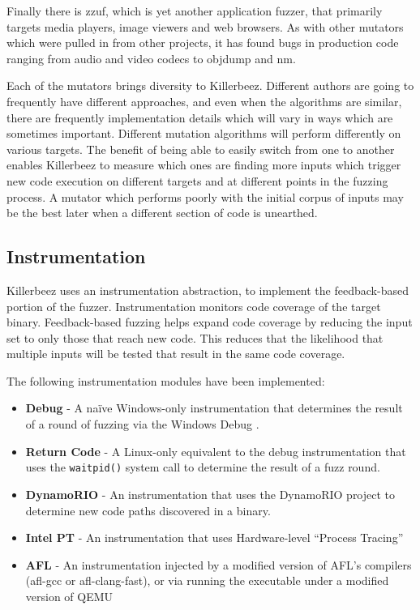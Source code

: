 Finally there is zzuf, which is yet another application fuzzer, that
primarily targets media players, image viewers and web browsers.  As with
other mutators which were pulled in from other projects, it has found bugs in
production code ranging from audio and video codecs to objdump and nm.

Each of the mutators brings diversity to Killerbeez.  Different authors are
going to frequently have different approaches, and even when the algorithms
are similar, there are frequently implementation details which will vary in
ways which are sometimes important.  Different mutation algorithms will
perform differently on various targets.  The benefit of being able to easily
switch from one to another enables Killerbeez to measure which ones are finding
more inputs which trigger new code execution on different targets and at different points in
the fuzzing process.  A mutator which performs poorly with the initial corpus
of inputs may be the best later when a different section of code is unearthed.

\subsection{Instrumentation} \label{Instrumentation}
Killerbeez uses an instrumentation abstraction, to implement the
feedback-based portion of the fuzzer. Instrumentation monitors code coverage of
the target binary. Feedback-based fuzzing helps expand code
coverage by reducing the input set to only those that reach new code.
This reduces that the likelihood that multiple inputs will be tested that result
in the same code coverage.

The following instrumentation modules have been implemented:
\begin{itemize}[noitemsep]
\item \textbf{Debug} - A na\"ive Windows-only instrumentation that determines the
	result of a round of fuzzing via the Windows Debug \API{}.
\item \textbf{Return Code} - A Linux-only equivalent to the debug instrumentation that
	uses the \texttt{waitpid()} system call to determine the result of a fuzz round.
\item \textbf{DynamoRIO} - An instrumentation that uses the DynamoRIO project\cite{dynamo} to
	determine new code paths discovered in a binary.
\item \textbf{Intel PT} - An instrumentation that uses Hardware-level ``Process Tracing''
\item \textbf{AFL} - An instrumentation injected by a modified version of AFL's compilers (afl-gcc or
	afl-clang-fast), or via running the executable under a modified version of QEMU\cite{qemu}
\end{itemize}


